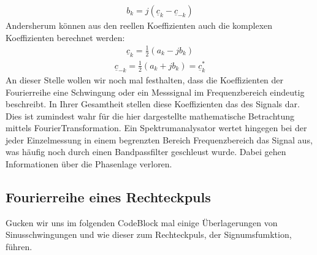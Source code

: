 \documentclass[letterpaper,10pt,english]{jupyterBook}
\begin{document}
\begin{equation*}
\begin{split}b_k = j (\underline{c}_{k} - \underline{c}_{-k})\end{split}
\end{equation*}
\sphinxAtStartPar
Andersherum können aus den reellen Koeffizienten auch die komplexen Koeffizienten berechnet werden:
\begin{equation*}
\begin{split}\underline c_k = \frac{1}{2} (a_k - j b_k)\end{split}
\end{equation*}\begin{equation*}
\begin{split}\underline c_{-k} = \frac{1}{2} (a_k + j b_k) = \underline c_k^*\end{split}
\end{equation*}
\sphinxAtStartPar
An dieser Stelle wollen wir noch mal festhalten, dass die Koeffizienten der Fourierreihe eine Schwingung oder ein Messsignal im Frequenzbereich eindeutig beschreibt. In Ihrer Gesamtheit stellen diese Koeffizienten das  des Signals dar. Dies ist zumindest wahr für die hier dargestellte mathematische Betrachtung mittels Fourier\sphinxhyphen{}Transformation. Ein Spektrumanalysator wertet hingegen bei der jeder Einzelmessung in einem begrenzten Bereich Frequenzbereich das Signal aus, was häufig noch durch einen Bandpassfilter geschleust wurde. Dabei gehen Informationen über die Phasenlage verloren.


\subsection{Fourierreihe eines Rechteckpuls}
\label{\detokenize{content/3_FourierAnalyse:fourierreihe-eines-rechteckpuls}}
\sphinxAtStartPar


\sphinxAtStartPar
Gucken wir uns im folgenden Code\sphinxhyphen{}Block mal einige Überlagerungen von Sinusschwingungen und wie dieser zum Rechteckpuls, der Signumsfumktion, führen.
\end{document}
